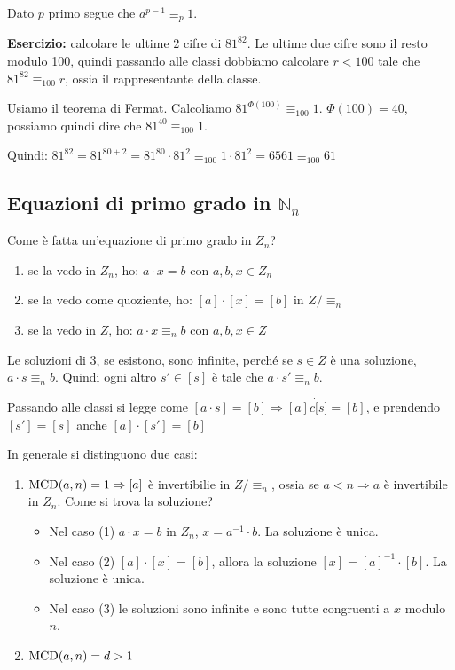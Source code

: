 \begin{cor}
Dato $p$ primo segue che $a^{p-1} \equiv_p 1$.
\end{cor}

\textbf{Esercizio:} calcolare le ultime 2 cifre di $81^{82}$. Le ultime due cifre sono il resto modulo 100, quindi passando alle classi dobbiamo calcolare $r < 100$ tale che $81^{82} \equiv_{100} r$, ossia il rappresentante della classe.

Usiamo il teorema di Fermat. Calcoliamo $81^{\Phi (100)} \equiv_{100} 1$. $\Phi(100) = 40$, possiamo quindi dire che $81^{40} \equiv_{100} 1$.

Quindi: $81^{82} = 81^{80 + 2} = 81^{80} \cdot 81^{2} \equiv_{100} 1 \cdot 81^{2} = 6561 \equiv_{100} 61$

\subsection{Equazioni di primo grado in $\mathbb{N}_n$}

Come \`e fatta un'equazione di primo grado in $Z_n$?

\begin{enumerate}
    \item se la vedo in $Z_n$, ho: $a \cdot x = b$ con $a, b, x \in Z_n$
    \item se la vedo come quoziente, ho: $[a] \cdot [x] = [b]$ in $Z / \equiv_n$
    \item se la vedo in $Z$, ho: $a \cdot x \equiv_n b$ con $a, b, x \in Z$
\end{enumerate}

\begin{oss}
Le soluzioni di 3, se esistono, sono infinite, perch\'e se $s \in Z$ \`e una soluzione, $a \cdot s \equiv_n b$. Quindi ogni altro $s' \in [s]$ \`e tale che $a \cdot s' \equiv_n b$.

Passando alle classi si legge come $[a \cdot s] = [b] \Rightarrow [a] c\dot [s] = [b]$, e prendendo $[s'] = [s]$ anche $[a] \cdot [s'] = [b]$
\end{oss}

In generale si distinguono due casi:
\begin{enumerate}
    \item $\operatorname{MCD}(a, n) = 1 \Rightarrow [a]$ \`e invertibilie in $Z / \equiv_n$, ossia se $a < n \Rightarrow a$ \`e invertibile in $Z_n$. Come si trova la soluzione?
    \begin{itemize}
        \item Nel caso (1) $a \cdot x = b$ in $Z_n$, $x = a^{-1} \cdot b$. La soluzione \`e unica.
        \item Nel caso (2) $[a] \cdot [x] = [b]$, allora la soluzione $[x] = [a]^{-1} \cdot [b]$. La soluzione \`e unica.
        \item Nel caso (3) le soluzioni sono infinite e sono tutte congruenti a $x$ modulo $n$.
    \end{itemize}
    \item $\operatorname{MCD}(a, n) = d > 1$
\end{enumerate}

